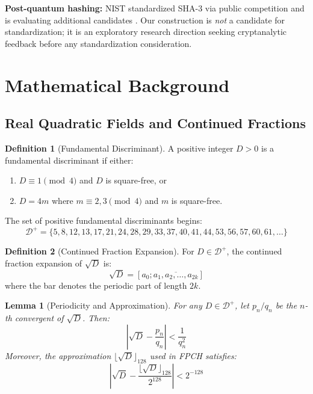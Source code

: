 \documentclass[11pt,a4paper]{article}
\theoremstyle{plain}
\newtheorem{lemma}[theorem]{Lemma}
\theoremstyle{definition}
\newtheorem{definition}{Definition}[section]
\theoremstyle{remark}
\begin{document}
\textbf{Post-quantum hashing:} NIST standardized SHA-3 \cite{nist2015} via public competition and is evaluating additional candidates \cite{nist2024}. Our construction is \textit{not} a candidate for standardization; it is an exploratory research direction seeking cryptanalytic feedback before any standardization consideration.

\section{Mathematical Background}

\subsection{Real Quadratic Fields and Continued Fractions}

\begin{definition}[Fundamental Discriminant]\label{def:disc}
A positive integer $D > 0$ is a fundamental discriminant if either:
\begin{enumerate}
    \item $D \equiv 1 \pmod{4}$ and $D$ is square-free, or
    \item $D = 4m$ where $m \equiv 2,3 \pmod{4}$ and $m$ is square-free.
\end{enumerate}
The set of positive fundamental discriminants begins:
\begin{equation}
\mathcal{D}^+ = \{5, 8, 12, 13, 17, 21, 24, 28, 29, 33, 37, 40, 41, 44, 53, 56, 57, 60, 61, \ldots\}
\end{equation}
\end{definition}

\begin{definition}[Continued Fraction Expansion]
For $D \in \mathcal{D}^+$, the continued fraction expansion of $\sqrt{D}$ is:
\begin{equation}
\sqrt{D} = [a_0; \overline{a_1, a_2, \ldots, a_{2k}}]
\end{equation}
where the bar denotes the periodic part of length $2k$.
\end{definition}

\begin{lemma}[Periodicity and Approximation]\label{lem:cf}
For any $D \in \mathcal{D}^+$, let $p_n/q_n$ be the $n$-th convergent of $\sqrt{D}$. Then:
\begin{equation}
\left|\sqrt{D} - \frac{p_n}{q_n}\right| < \frac{1}{q_n^2}
\end{equation}
Moreover, the approximation $\lfloor\sqrt{D}\rfloor_{128}$ used in FPCH satisfies:
\begin{equation}
\left|\sqrt{D} - \frac{\lfloor\sqrt{D}\rfloor_{128}}{2^{128}}\right| < 2^{-128}
\end{equation}
\end{lemma}
\end{document}

